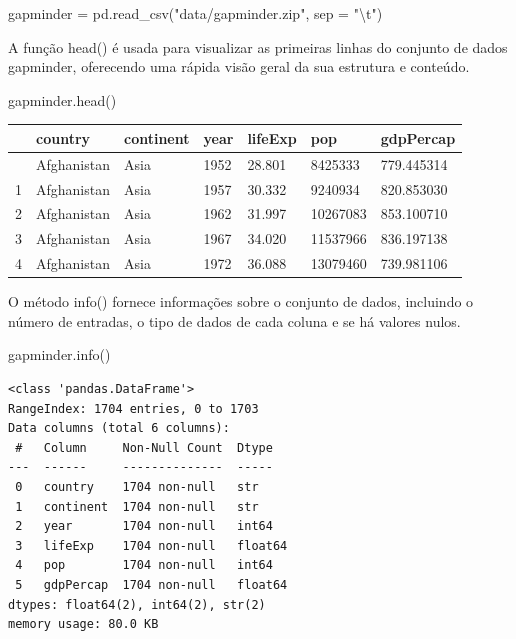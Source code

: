 \documentclass[
  portuguese,
  letterpaper,
  DIV=11,
  numbers=noendperiod]{scrreprt}
\newenvironment{Shaded}{\begin{snugshade}}{\end{snugshade}}
\newcommand{\CharTok}[1]{\textcolor[rgb]{0.13,0.47,0.30}{#1}}
\newcommand{\NormalTok}[1]{\textcolor[rgb]{0.00,0.23,0.31}{#1}}
\newcommand{\OperatorTok}[1]{\textcolor[rgb]{0.37,0.37,0.37}{#1}}
\newcommand{\StringTok}[1]{\textcolor[rgb]{0.13,0.47,0.30}{#1}}
\theoremstyle{definition}
\theoremstyle{remark}
\begin{document}
\begin{Shaded}
\begin{Highlighting}[]
\NormalTok{gapminder }\OperatorTok{=}\NormalTok{ pd.read\_csv(}\StringTok{"data/gapminder.zip"}\NormalTok{, sep }\OperatorTok{=} \StringTok{"}\CharTok{\textbackslash{}t}\StringTok{"}\NormalTok{)}
\end{Highlighting}
\end{Shaded}

A função head() é usada para visualizar as primeiras linhas do conjunto
de dados gapminder, oferecendo uma rápida visão geral da sua estrutura e
conteúdo.

\begin{Shaded}
\begin{Highlighting}[]
\NormalTok{gapminder.head()}
\end{Highlighting}
\end{Shaded}

\begin{longtable}[]{@{}lllllll@{}}
\toprule\noalign{}
& country & continent & year & lifeExp & pop & gdpPercap \\
\midrule\noalign{}
\endhead
\bottomrule\noalign{}
\endlastfoot
0 & Afghanistan & Asia & 1952 & 28.801 & 8425333 & 779.445314 \\
1 & Afghanistan & Asia & 1957 & 30.332 & 9240934 & 820.853030 \\
2 & Afghanistan & Asia & 1962 & 31.997 & 10267083 & 853.100710 \\
3 & Afghanistan & Asia & 1967 & 34.020 & 11537966 & 836.197138 \\
4 & Afghanistan & Asia & 1972 & 36.088 & 13079460 & 739.981106 \\
\end{longtable}

O método info() fornece informações sobre o conjunto de dados, incluindo
o número de entradas, o tipo de dados de cada coluna e se há valores
nulos.

\begin{Shaded}
\begin{Highlighting}[]
\NormalTok{gapminder.info()}
\end{Highlighting}
\end{Shaded}

\begin{verbatim}
<class 'pandas.DataFrame'>
RangeIndex: 1704 entries, 0 to 1703
Data columns (total 6 columns):
 #   Column     Non-Null Count  Dtype  
---  ------     --------------  -----  
 0   country    1704 non-null   str    
 1   continent  1704 non-null   str    
 2   year       1704 non-null   int64  
 3   lifeExp    1704 non-null   float64
 4   pop        1704 non-null   int64  
 5   gdpPercap  1704 non-null   float64
dtypes: float64(2), int64(2), str(2)
memory usage: 80.0 KB
\end{verbatim}
\end{document}
